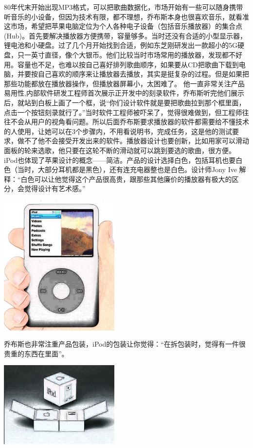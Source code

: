 80年代末开始出现MP3格式，可以把歌曲数据化，市场开始有一些可以随身携带听音乐的小设备，但因为技术有限，都不理想，乔布斯本身也很喜欢音乐，就看准这市场，希望把苹果电脑定位为个人各种电子设备（包括音乐播放器）的集合点(Hub)。首先要解决播放器方便携带，容量够多。当时还没有合适的小型显示器，锂电池和小硬盘。过了几个月开始找到合适，例如东芝刚研发出一款超小的5G硬盘，只一英寸直径，像个大银币。他们比较当时市场常用的播放器，发现都不好用。容量也不足，也难以按自己喜好排列歌曲顺序，如果要从CD把歌曲下载到电脑，并要按自己喜欢的顺序来让播放器去播放，其实是挺复杂的过程。但是如果把那些功能都放在播放器操作，但播放器屏幕小，太困难了。
他一直非常关注产品易用性,内部软件研发工程师首次展示正开发中的刻录软件，乔布斯听完他们展示后，就站到白板上画了一个框，说“你们设计软件就是要把歌曲拉到那个框里面，点击一个按钮刻录就行了。”当时软件工程师被吓呆了，觉得很难做到，但工程师往往不会从用户的视角看问题。所以后面乔布斯要求播放器的软件都需要给不懂技术的人使用，让她可以在3个步骤内，不用看说明书，完成任务，这是他的测试要求，做不了他不会接受开发出来的软件。播放器设计也要创新，比如用家可以滑动面板的轮来选歌，他只要在这轮不断的滑动就可以跳到要选的歌曲，很方便。iPod也体现了苹果设计的概念——简洁。产品的设计选择白色，包括耳机也要白色（当时，大部分耳机都是黑色），还有连充电器整也是白色。设计师Jony Ive 解释：“白色可以让他觉得这个产品很高贵，跟那些其他廉价的播放器有极大的区分，会觉得设计有艺术感。”



\includegraphics[width=6cm]{!ipodcutoutScreenshot_2023-12-06_201652.jpg}

乔布斯也非常注重产品包装，iPod的包装让你觉得：``在拆包装时，觉得有一件很贵重的东西在里面''。


\includegraphics[width=6cm]{IpodPackageScreenshot_2023-07-23_201312_labi.jpg}


